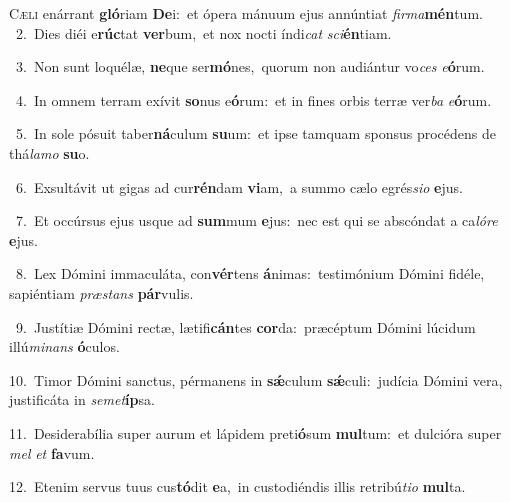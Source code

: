 \lettrine{\initial\textcolor{\initialcolor}{C}}{æli} enárrant \textbf{gló}\-riam \textbf{De}\-i:~\star et ópera mánuum ejus annúntiat \textit{fir}\-\textit{ma}\textbf{mén}tum.\\
{\numbfont\textcolor{\numbcolor}{~2.}}~Dies diéi e\-\textbf{rúc}\-tat \textbf{ver}\-bum,~\star et nox nocti índi\textit{cat} \textit{sci}\-\textbf{én}tiam.\par
{\numbfont\textcolor{\numbcolor}{~3.}}~Non sunt loquélæ, \textbf{ne}\-que ser\-\textbf{mó}\-nes,~\star quorum non audiántur vo\textit{ces} \textit{e}\-\textbf{ó}rum.\par
{\numbfont\textcolor{\numbcolor}{~4.}}~In omnem terram exívit \textbf{so}\-nus e\-\textbf{ó}\-rum:~\star et in fines orbis terræ ver\textit{ba} \textit{e}\-\textbf{ó}rum.\par
{\numbfont\textcolor{\numbcolor}{~5.}}~In sole pósuit taber\-\textbf{ná}\-culum \textbf{su}\-um:~\star et ipse tamquam sponsus procédens de thá\-\textit{la}\-\textit{mo} \textbf{su}\-o.\par
{\numbfont\textcolor{\numbcolor}{~6.}}~Exsultávit ut gigas ad cur\-\textbf{rén}\-dam \textbf{vi}\-am,~\star a summo cælo egrés\-\textit{si}\-\textit{o} \textbf{e}\-jus.\par
{\numbfont\textcolor{\numbcolor}{~7.}}~Et occúrsus ejus usque ad \textbf{sum}\-mum \textbf{e}\-jus:~\star nec est qui se abscóndat a ca\-\textit{ló}\-\textit{re} \textbf{e}\-jus.\par
{\numbfont\textcolor{\numbcolor}{~8.}}~Lex Dómini immaculáta, con\-\textbf{vér}\-tens \textbf{á}\-nimas:~\star testimónium Dómini fidéle, sapiéntiam \textit{præ}\-\textit{stans} \textbf{pár}\-vulis.\par
{\numbfont\textcolor{\numbcolor}{~9.}}~Justítiæ Dómini rectæ, lætifi\-\textbf{cán}\-tes \textbf{cor}\-da:~\star præcéptum Dómini lúcidum illú\-\textit{mi}\-\textit{nans} \textbf{ó}\-culos.\par
{\numbfont\textcolor{\numbcolor}{10.}}~Timor Dómini sanctus, pérmanens in \textbf{sǽ}\-culum \textbf{sǽ}\-culi:~\star judícia Dómini vera, justificáta in \textit{se}\-\textit{met}\textbf{íp}sa.\par
{\numbfont\textcolor{\numbcolor}{11.}}~Desiderabília super aurum et lápidem preti\-\textbf{ó}\-sum \textbf{mul}\-tum:~\star et dulcióra super \textit{mel} \textit{et} \textbf{fa}\-vum.\par
{\numbfont\textcolor{\numbcolor}{12.}}~Etenim servus tuus cus\-\textbf{tó}\-dit \textbf{e}\-a,~\star in custodiéndis illis retribú\-\textit{ti}\-\textit{o} \textbf{mul}\-ta.\par
